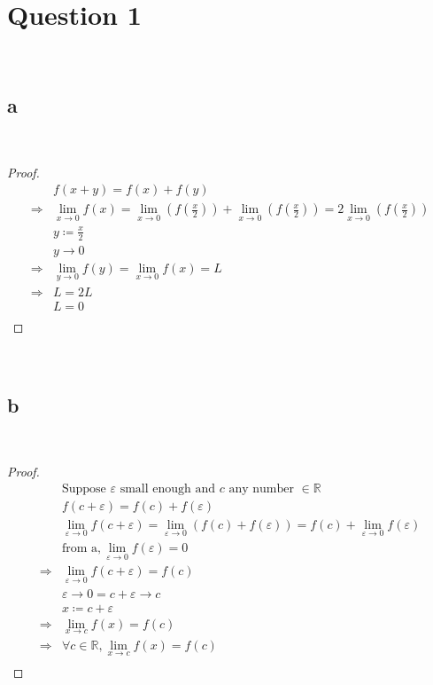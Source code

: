 \documentclass{article}
\begin{document}
\section*{Question 1}

~

\subsection*{a}

~

\begin{proof}
    \begin{align*}
        &f(x+y)=f(x)+f(y)\\
        \Rightarrow&\lim_{x\to0}f(x)=\lim_{x\to0}\left(f\left(\frac{x}{2}\right)\right)+\lim_{x\to0}\left(f\left(\frac{x}{2}\right)\right)=2\lim_{x\to0}\left(f\left(\frac{x}{2}\right)\right)\\
        &y\coloneqq \frac{x}{2}\\
        &y\to0\\
        \Rightarrow&\lim_{y\to0}f(y)=\lim_{x\to0}f(x)=L\\
        \Rightarrow&L=2L\\
        &L=0\\
    \end{align*}
\end{proof}

~

\subsection*{b}

~

\begin{proof}
    \begin{align*}
        &\text{Suppose }\varepsilon \text{ small enough}\text{ and }c\text{ any number }\in \mathbb{R}\\
        &f(c+\varepsilon)=f(c)+f(\varepsilon)\\
        &\lim_{\varepsilon\to0}f(c+\varepsilon)=\lim_{\varepsilon\to0}(f(c)+f(\varepsilon))=f(c)+\lim_{\varepsilon\to0}f(\varepsilon)\\
        &\text{from a},\lim_{\varepsilon\to0}f(\varepsilon)=0\\
        \Rightarrow&\lim_{\varepsilon\to0}f(c+\varepsilon)=f(c)\\
        &\varepsilon\to0=c+\varepsilon\to c\\
        &x\coloneqq c+\varepsilon\\
        \Rightarrow&\lim_{x\to c}f(x)=f(c)\\
        \Rightarrow&\forall c\in\mathbb{R},\lim_{x\to c}f(x)=f(c)\\
    \end{align*}
\end{proof}
\end{document}

